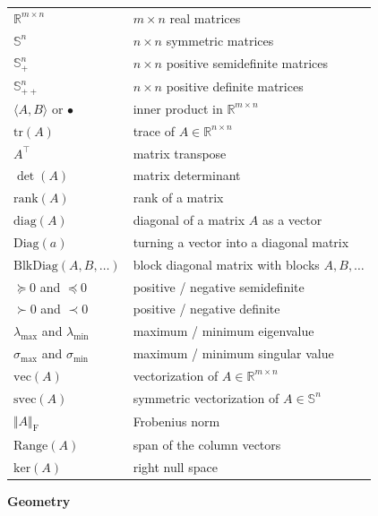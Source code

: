 \documentclass[
]{book}
\theoremstyle{definition}
\theoremstyle{definition}
\theoremstyle{definition}
\theoremstyle{definition}
\theoremstyle{remark}
\begin{document}
\begin{longtable}[]{@{}
  >{\raggedright\arraybackslash}p{}
  >{\raggedright\arraybackslash}p{}@{}}
\toprule\noalign{}
\endhead
\bottomrule\noalign{}
\endlastfoot
\(\mathbb{R}^{m \times n}\) & \(m \times n\) real matrices \\
\(\mathbb{S}^{n}\) & \(n\times n\) symmetric matrices \\
\(\mathbb{S}^{n}_{+}\) & \(n\times n\) positive semidefinite matrices \\
\(\mathbb{S}^{n}_{++}\) & \(n\times n\) positive definite matrices \\
\(\langle A, B \rangle\) or \(\bullet\) & inner product in \(\mathbb{R}^{m \times n}\) \\
\(\mathrm{tr}(A)\) & trace of \(A \in \mathbb{R}^{n \times n}\) \\
\(A^\top\) & matrix transpose \\
\(\det(A)\) & matrix determinant \\
\(\mathrm{rank}(A)\) & rank of a matrix \\
\(\mathrm{diag}(A)\) & diagonal of a matrix \(A\) as a vector \\
\(\mathrm{Diag}(a)\) & turning a vector into a diagonal matrix \\
\(\mathrm{BlkDiag}(A,B,\dots)\) & block diagonal matrix with blocks \(A,B,\dots\) \\
\(\succeq 0\) and \(\preceq 0\) & positive / negative semidefinite \\
\(\succ 0\) and \(\prec 0\) & positive / negative definite \\
\(\lambda_{\max}\) and \(\lambda_{\min}\) & maximum / minimum eigenvalue \\
\(\sigma_{\max}\) and \(\sigma_{\min}\) & maximum / minimum singular value \\
\(\mathrm{vec}(A)\) & vectorization of \(A \in \mathbb{R}^{m \times n}\) \\
\(\mathrm{svec}(A)\) & symmetric vectorization of \(A \in \mathbb{S}^{n}\) \\
\(\Vert A \Vert_\mathrm{F}\) & Frobenius norm \\
\(\mathrm{Range}(A)\) & span of the column vectors \\
\(\mathrm{ker}(A)\) & right null space \\
\end{longtable}

\textbf{Geometry}
\end{document}

